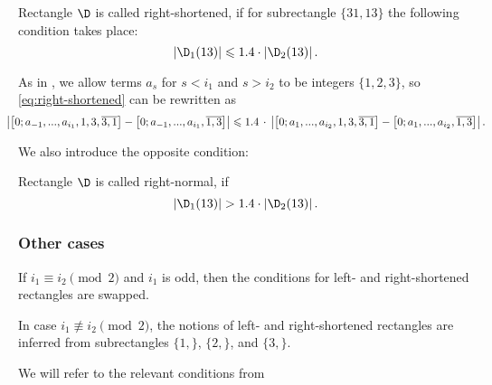 \begin{definition}
	Rectangle $\D$ is called right-shortened,
	if for subrectangle $\{31, 13\}$ the following condition takes place:
	\begin{equation}
		\label{eq:right-shortened}
		\left| \D_1(13) \right| \leqslant 1.4 \cdot \left| \D_2(13) \right|.
	\end{equation}
\end{definition}

As in ,
we allow terms $a_s$ for $s < i_1$ and $s > i_2$ to be integers $\{1, 2, 3\}$,
so \ref{eq:right-shortened} can be rewritten as
%
\begin{equation*}
	\hspace*{-12pt}
	\left|
		\left[ 0; a_{-1}, ..., a_{i_1}, 1, 3, \overline{3, 1} \right] -
		\left[ 0; a_{-1}, ..., a_{i_1}, \overline{1, 3} \right]
	\right| \leqslant 1.4 \,\cdot\, \left|
		\left[ 0; a_{1}, ..., a_{i_2}, 1, 3, \overline{3, 1} \right] -
		\left[ 0; a_{1}, ..., a_{i_2}, \overline{1, 3} \right]
	\right|.
	\hspace*{-12pt}
\end{equation*}

We also introduce the opposite condition:

\begin{definition}
	Rectangle $\D$ is called right-normal, if
	\begin{equation}
		\label{eq:right-normal}
		\left| \D_1(13) \right| > 1.4 \cdot \left| \D_2(13) \right|.
	\end{equation}
\end{definition}


\subsubsection{Other cases}

If $i_1 \equiv i_2 \pmod 2$ and $i_1$ is odd,
then the conditions for left- and right-shortened rectangles are swapped.

In case $i_1 \not\equiv i_2 \pmod 2$,
the notions of left- and right-shortened rectangles
are inferred from subrectangles $\{1,\}$, $\{2,\}$, and $\{3,\}$.

We will refer to the relevant conditions from 
